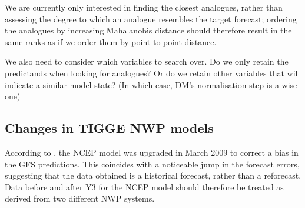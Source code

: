 \documentclass[10pt,fleqn]{article}
\begin{document}
We are currently only interested in finding the closest analogues, rather than assessing the degree to which an analogue resembles the target forecast; ordering the analogues by increasing Mahalanobis distance should therefore result in the same ranks as if we order them by point-to-point distance.

We also need to consider which variables to search over. Do we only retain the predictands when looking for analogues? Or do we retain other variables that will indicate a similar model state? (In which case, DM's normalisation step is a wise one)







\subsection{Changes in TIGGE NWP models}

According to \cite{TIGGEupgrades}, the NCEP model was upgraded in March 2009 to correct a bias in the GFS predictions. This coincides with a noticeable jump in the forecast errors, suggesting that the data obtained is a historical forecast, rather than a reforecast. Data before and after Y3 for the NCEP model should therefore be treated as derived from two different NWP systems.

\hrulefill
\printbibliography
\end{document}
